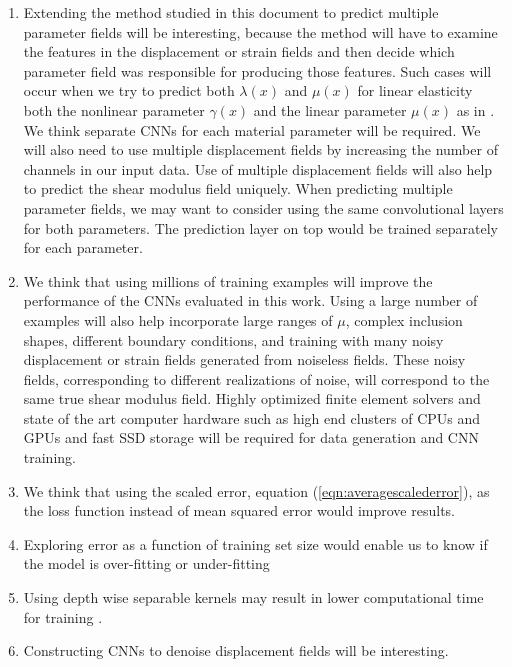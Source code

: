 \documentclass[12pt]{article}
\begin{document}
\begin{enumerate}
\item{Extending the method studied in this document to predict multiple parameter fields will be interesting, because the method will have to examine the features in the displacement or strain fields and then decide which parameter field was responsible for producing those features. Such cases will occur when we try to predict both $\lambda(x)$ and $\mu(x)$ for linear elasticity both the nonlinear parameter $\gamma(x)$ and the linear parameter $\mu(x)$ as in \cite{paper:gokhale2008}. We think separate CNNs for each material parameter will be required. We will also need to use multiple displacement fields \cite{paper:barbonegokhale,paper:barbonebamber} by increasing the number of channels in our input data. Use of multiple displacement fields will also help to predict the shear modulus field uniquely. When predicting multiple parameter fields, we may want to consider using the same convolutional layers for both parameters. The prediction layer on top would be trained separately for each parameter.}
\item{We think that using millions of training examples will improve the performance of the CNNs evaluated in this work. Using a large number of examples will also help incorporate large ranges of $\mu$, complex inclusion shapes, different boundary conditions, and training with many noisy displacement or strain fields generated from noiseless fields. These noisy fields, corresponding to different realizations of noise, will correspond to the same true shear modulus field. Highly optimized finite element solvers and state of the art computer hardware such as high end clusters of CPUs and GPUs and fast SSD storage will be required for data generation and CNN training.}
\item{We think that using the scaled error, equation (\ref{eqn:averagescalederror}), as the loss function instead of mean squared error would improve results.}
\item{Exploring error as a function of training set size would enable us to know if the model is over-fitting or under-fitting}
\item{Using depth wise separable kernels may result in lower computational time for training \cite{misc:sepconv}.}
\item{Constructing CNNs to denoise displacement fields will be interesting.}
\end{enumerate}
\clearpage
\newpage
\end{document}
